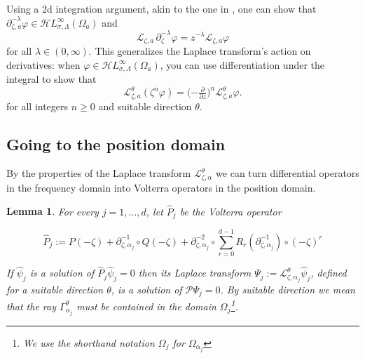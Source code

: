 \documentclass{article}
\theoremstyle{plain}
\newtheorem{lemma}{Lemma}
\newcommand{\R}{\mathbb{R}}
\newcommand{\laplace}{\mathcal{L}}
\newcommand{\fracderiv}[3]{\partial^{#1}_{#2, #3}}
\newcommand{\singexp}[2]{\mathcal{H}L^\infty_{#1, #2}}
\begin{document}

Using a 2d integration argument, akin to the one in \cite[Theorem~2.39]{laplace-tfm}, one can show that $\partial^{-\lambda}_{\zeta,a} \varphi \in \singexp{\sigma}{\Lambda}(\Omega_a)$ and
\[ \laplace_{\zeta,a}\,\partial^{-\lambda}_{\zeta} \varphi = z^{-\lambda} \laplace_{\zeta, a} \varphi \]
for all $\lambda \in (0, \infty)$. This generalizes the Laplace transform's action on derivatives: when $\varphi \in \singexp{\sigma}{\Lambda}(\Omega_a)$, you can use differentiation under the integral to show that~\cite[Theorem~1.34]{laplace-tfm}
\begin{equation}%
\laplace_{\zeta,a}^\theta (\zeta^n \varphi) = \big({-\tfrac{\partial}{\partial z}}\big)^n \laplace_{\zeta,a}^\theta \varphi.
\end{equation}
for all integers $n \ge 0$ and suitable direction $\theta$.

\subsection{Going to the position domain}

By the properties of the Laplace transform $\laplace_{\zeta,\alpha}^{\theta}$ we can turn differential operators in the frequency domain into Volterra operators in the position domain. 

\begin{lemma}
 For every $j=1,...,d$, let $\hat{P}_j$ be the Volterra operator 
 
\begin{equation}\label{P-hat_j}
\hat{P}_j:=P(-\zeta)+\partial_{\zeta,\alpha_j}^{-1}\circ Q(-\zeta)+\partial_{\zeta,\alpha_j}^{-2}\circ\sum_{r=0}^{d-1}R_r(\partial_{\zeta,\alpha_j}^{-1})\circ (-\zeta)^r
\end{equation}
 
If $\hat{\psi}_j$ is a solution of $\hat{P}_j\hat{\psi}_j=0$ then its Laplace transform $\Psi_j:=\laplace_{\zeta,\alpha_j}^{\theta}\hat{\psi}_j$, defined for a suitable direction $\theta$, is a solution of $\mathcal{P}\Psi_j=0$. By suitable direction we mean that the ray $\Gamma_{\alpha_j}^\theta$ must be contained in the domain $\Omega_j$\footnote{We use the shorthand notation $\Omega_j$ for $\Omega_{\alpha_j}$}.     
\end{lemma}
\end{document}
